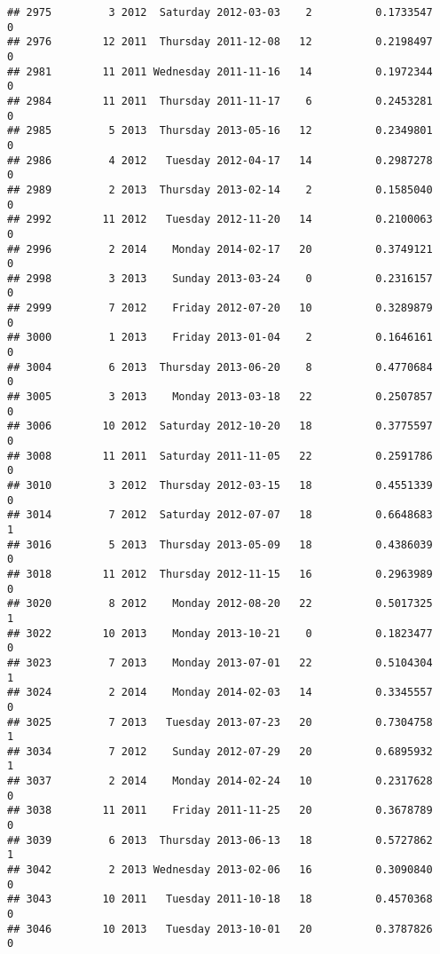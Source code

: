 \documentclass[
]{article}
\begin{document}
\begin{verbatim}
## 2975         3 2012  Saturday 2012-03-03    2          0.1733547             0
## 2976        12 2011  Thursday 2011-12-08   12          0.2198497             0
## 2981        11 2011 Wednesday 2011-11-16   14          0.1972344             0
## 2984        11 2011  Thursday 2011-11-17    6          0.2453281             0
## 2985         5 2013  Thursday 2013-05-16   12          0.2349801             0
## 2986         4 2012   Tuesday 2012-04-17   14          0.2987278             0
## 2989         2 2013  Thursday 2013-02-14    2          0.1585040             0
## 2992        11 2012   Tuesday 2012-11-20   14          0.2100063             0
## 2996         2 2014    Monday 2014-02-17   20          0.3749121             0
## 2998         3 2013    Sunday 2013-03-24    0          0.2316157             0
## 2999         7 2012    Friday 2012-07-20   10          0.3289879             0
## 3000         1 2013    Friday 2013-01-04    2          0.1646161             0
## 3004         6 2013  Thursday 2013-06-20    8          0.4770684             0
## 3005         3 2013    Monday 2013-03-18   22          0.2507857             0
## 3006        10 2012  Saturday 2012-10-20   18          0.3775597             0
## 3008        11 2011  Saturday 2011-11-05   22          0.2591786             0
## 3010         3 2012  Thursday 2012-03-15   18          0.4551339             0
## 3014         7 2012  Saturday 2012-07-07   18          0.6648683             1
## 3016         5 2013  Thursday 2013-05-09   18          0.4386039             0
## 3018        11 2012  Thursday 2012-11-15   16          0.2963989             0
## 3020         8 2012    Monday 2012-08-20   22          0.5017325             1
## 3022        10 2013    Monday 2013-10-21    0          0.1823477             0
## 3023         7 2013    Monday 2013-07-01   22          0.5104304             1
## 3024         2 2014    Monday 2014-02-03   14          0.3345557             0
## 3025         7 2013   Tuesday 2013-07-23   20          0.7304758             1
## 3034         7 2012    Sunday 2012-07-29   20          0.6895932             1
## 3037         2 2014    Monday 2014-02-24   10          0.2317628             0
## 3038        11 2011    Friday 2011-11-25   20          0.3678789             0
## 3039         6 2013  Thursday 2013-06-13   18          0.5727862             1
## 3042         2 2013 Wednesday 2013-02-06   16          0.3090840             0
## 3043        10 2011   Tuesday 2011-10-18   18          0.4570368             0
## 3046        10 2013   Tuesday 2013-10-01   20          0.3787826             0

\end{verbatim}
\end{document}
